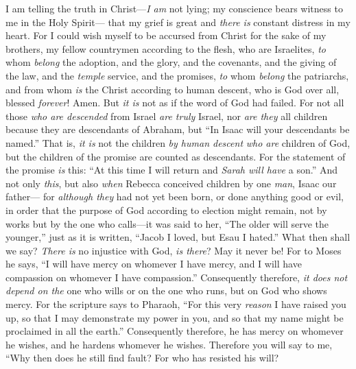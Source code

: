 \begin{biblechapter} %
 I am telling the truth in Christ—\textit{I am} not lying; my conscience bears witness to me in the Holy Spirit—
\verse that my grief is great and \textit{there is} constant distress in my heart.
\verse For I could wish myself to be accursed from Christ for the sake of my brothers, my fellow countrymen according to the flesh,
\verse who are Israelites, \textit{to} whom \textit{belong} the adoption, and the glory, and the covenants, and the giving of the law, and the \textit{temple} service, and the promises,
\verse \textit{to} whom \textit{belong} the patriarchs, and from whom \textit{is} the Christ according to human descent, who is God over all, blessed \textit{forever}! Amen.
\verse But \textit{it is} not as if the word of God had failed. For not all those \textit{who are descended} from Israel \textit{are truly} Israel,
\verse nor \textit{are they} all children because they are descendants of Abraham, but “In Isaac will your descendants be named.”
\verse That is, \textit{it is} not the children \textit{by human descent} \textit{who are} children of God, but the children of the promise are counted as descendants.
\verse For the statement of the promise \textit{is} this: “At this time I will return and \textit{Sarah will have} a son.”
\verse And not only \textit{this}, but also \textit{when} Rebecca conceived children by one \textit{man}, Isaac our father—
\verse for \textit{although they} had not yet been born, or done anything good or evil, in order that the purpose of God according to election might remain,
\verse not by works but by the one who calls—it was said to her, “The older will serve the younger,”
\verse just as it is written, “Jacob I loved, but Esau I hated.”
 What then shall we say? \textit{There is} no injustice with God, \textit{is there}? May it never be!
\verse For to Moses he says, “I will have mercy on whomever I have mercy, and I will have compassion on whomever I have compassion.”
\verse Consequently therefore, \textit{it does not depend on the} one who wills or on the one who runs, but on God who shows mercy.
\verse For the scripture says to Pharaoh, “For this very \textit{reason} I have raised you up, so that I may demonstrate my power in you, and so that my name might be proclaimed in all the earth.”
\verse Consequently therefore, he has mercy on whomever he wishes, and he hardens whomever he wishes.
\verse Therefore you will say to me, “Why then does he still find fault? For who has resisted his will?

\end{biblechapter}
